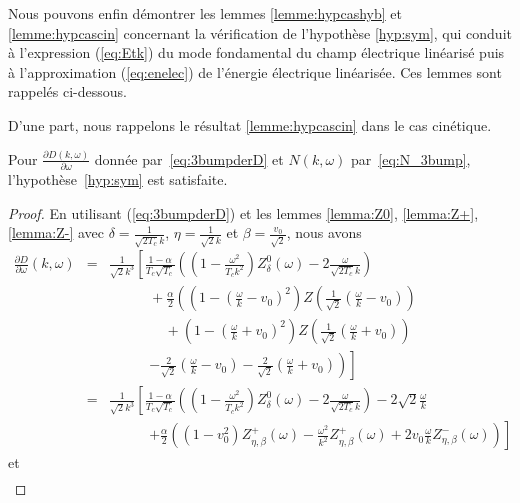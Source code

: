 Nous pouvons enfin démontrer les lemmes \ref{lemme:hypcashyb} et \ref{lemme:hypcascin} concernant la vérification de l'hypothèse \ref{hyp:sym}, qui conduit à l'expression (\ref{eq:Etk}) du mode fondamental du champ électrique linéarisé puis à l'approximation (\ref{eq:enelec}) de l'énergie électrique linéarisée. Ces lemmes sont rappelés ci-dessous.

D'une part, nous rappelons le résultat \ref{lemme:hypcascin} dans le cas cinétique.
\begin{lemma}
  Pour $\frac{\partial D(k,\omega)}{\partial\omega}$ donnée par~\eqref{eq:3bumpderD} et $N(k,\omega)$ par~\eqref{eq:N_3bump}, l'hypothèse~\ref{hyp:sym} est satisfaite.
\end{lemma}

\begin{proof}
  En utilisant (\ref{eq:3bumpderD}) et les lemmes \ref{lemma:Z0}, \ref{lemma:Z+}, \ref{lemma:Z-} avec $\delta=\frac{1}{\sqrt{2T_c}k}$, $\eta=\frac{1}{\sqrt{2}k}$ et $\beta=\frac{v_0}{\sqrt{2}}$, nous avons
  \begin{eqnarray*}
    \frac{\partial D}{\partial \omega}(k,\omega)&=&\frac{1}{\sqrt{2}k^3}\left[\frac{1-\alpha}{T_c\sqrt{T_c}}\left(\left(1-\frac{\omega^2}{T_ck^2}\right)Z_\delta^0\left(\omega\right)-2\frac{\omega}{\sqrt{2T_c}k}\right)\right.\nonumber\\
    &&~~~~~~~~~~~~~+\frac{\alpha}{2}\left(\left(1-\left(\frac{\omega}{k}-v_0\right)^2\right)Z\left(\frac{1}{\sqrt{2}}\left(\frac{\omega}{k}-v_0\right)\right)\right.\nonumber\\
    &&~~~~~~~~~~~~~~~~~~+\left.\left.\left(1-\left(\frac{\omega}{k}+v_0\right)^2\right)Z\left(\frac{1}{\sqrt{2}}\left(\frac{\omega}{k}+v_0\right)\right)\right.\right.\nonumber\\
    &&~~~~~~~~~~~~~\left.\left.-\frac{2}{\sqrt{2}}\left(\frac{\omega}{k}-v_0\right)-\frac{2}{\sqrt{2}}\left(\frac{\omega}{k}+v_0\right)\right)\right]\nonumber\\
    &=&\frac{1}{\sqrt{2}k^3}\left[\frac{1-\alpha}{T_c\sqrt{T_c}}\left(\left(1-\frac{\omega^2}{T_ck^2}\right)Z_\delta^0\left(\omega\right)-2\frac{\omega}{\sqrt{2T_c}k}\right)-2\sqrt{2}\frac{\omega}{k}\right.\nonumber\\
    &&~~~~~~~~~~~~~\left.+\frac{\alpha}{2}\left((1-v_0^2)Z_{\eta,\beta}^+\left(\omega\right)-\frac{\omega^2}{k^2}Z_{\eta,\beta}^+\left(\omega\right)+2v_0\frac{\omega}{k}Z_{\eta,\beta}^-\left(\omega\right)\right)\right]
  \end{eqnarray*}
  et
  \begin{eqnarray*}

\end{eqnarray*}
\end{proof}
